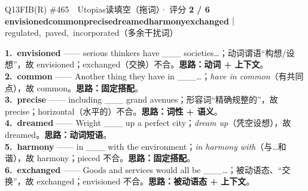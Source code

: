 \begin{qblock}{Q13\quad FIB(R) \#465\ \ Utopias}{读填空（拖词）· 评分 \textcolor{cAccent}{\bfseries 2 / 6}}
{\small \textbf{envisioned}\quad \textbf{common}\quad \textbf{precise}\quad \textbf{dreamed}\quad \textbf{harmony}\quad \textbf{exchanged}\quad ｜\quad regulated,\ paved,\ incorporated（多余干扰词）}
\begin{notebox}\footnotesize
\textbf{1.\ envisioned} —— serious thinkers have \_\_\_ societies…；动词谓语“构想/设想”，故 envisioned；exchanged（交换）不合。\textbf{思路：动词 + 上下文}。\\[2pt]
\textbf{2.\ common} —— Another thing they have in \_\_\_…；\emph{have in common}（有共同点），故 common。\textbf{思路：固定搭配}。\\[2pt]
\textbf{3.\ precise} —— including \_\_\_ grand avenues；形容词“精确规整的”，故 precise；horizontal（水平的）不合。\textbf{思路：词性 + 语义}。\\[2pt]
\textbf{4.\ dreamed} —— Wright \_\_\_ up a perfect city；\emph{dream up}（凭空设想），故 dreamed。\textbf{思路：动词短语}。\\[2pt]
\textbf{5.\ harmony} —— in \_\_\_ with the environment；\emph{in harmony with}（与…和谐），故 harmony；pieced 不合。\textbf{思路：固定搭配}。\\[2pt]
\textbf{6.\ exchanged} —— Goods and services would all be \_\_\_…；被动语态、“交换”，故 exchanged；envisioned 不合。\textbf{思路：被动语态 + 上下文}。
\end{notebox}
\end{qblock}

